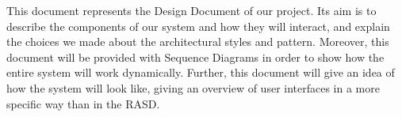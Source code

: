 This document represents the Design Document of our project. Its aim is to describe the components of our system and how they will interact, and explain the choices we made about the architectural styles and pattern. 
\newline
Moreover, this document will be provided with Sequence Diagrams in order to show how the entire system will work dynamically.
\newline
Further, this document will give an idea of how the system will look like, giving an overview of user interfaces in a more specific way than in the RASD.